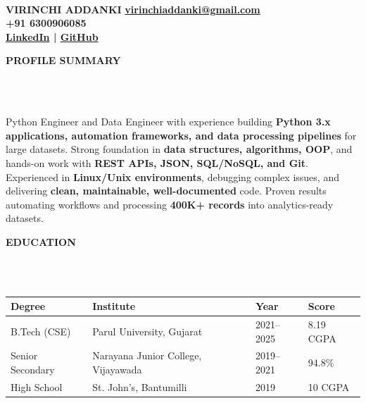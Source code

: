 \documentclass[a4paper,10pt]{article}
\newcommand{\lsep}{-0.5cm}
\newcommand{\resheading}[1]{{\small \colorbox{mygrey}{\begin{minipage}{0.975\textwidth}{\textbf{#1}}\end{minipage}}}}
\begin{document}
\hspace{0.5cm}\\[-1.8cm]

\textbf{VIRINCHI ADDANKI} \hspace{7.2cm} {\bf \href{mailto:virinchiaddanki@gmail.com}{virinchiaddanki@gmail.com}}\\
 \hspace{5.6cm} {\bf +91 6300906085} \\
 \hspace{8.1cm}
{\bf \href{https://www.linkedin.com/in/virinchi-addanki/}{LinkedIn} | \href{https://github.com/addanki-virinchi}{GitHub}} \\


\vspace{-2mm}

\resheading{\textbf{PROFILE SUMMARY}}\\[\lsep]\\

\hspace{0.11cm}
\begin{minipage}{0.98\textwidth}
Python Engineer and Data Engineer with experience building
\textbf{Python 3.x applications, automation frameworks, and data processing pipelines}
for large datasets. Strong foundation in \textbf{data structures, algorithms, OOP},
and hands-on work with \textbf{REST APIs, JSON, SQL/NoSQL, and Git}.
Experienced in \textbf{Linux/Unix environments}, debugging complex issues,
and delivering \textbf{clean, maintainable, well-documented} code.
Proven results automating workflows and processing \textbf{400K+ records}
into analytics-ready datasets.
\end{minipage}

\vspace{4mm}


\resheading{\textbf{EDUCATION}}\\[\lsep]\\

\indent
\begin{tabular}{ p{3cm} @{\hskip 0.15in} p{6cm} @{\hskip 0.15in} p{4cm} @{\hskip 0.15in} p{2cm} }
\toprule
\textbf{Degree} & \textbf{Institute} & \textbf{Year} & \textbf{Score} \\
\midrule
B.Tech (CSE) & Parul University, Gujarat & 2021--2025 & 8.19 CGPA \\
Senior Secondary & Narayana Junior College, Vijayawada & 2019--2021 & 94.8\% \\
High School & St. John's, Bantumilli & 2019 & 10 CGPA \\
\bottomrule
\end{tabular}
\end{document}
